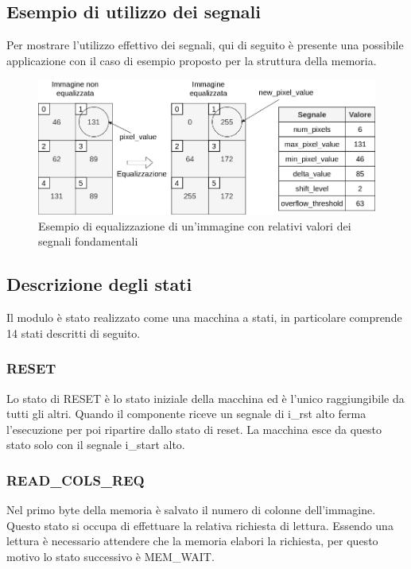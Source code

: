 \documentclass{article}
\begin{document}
\subsection{Esempio di utilizzo dei segnali}
Per mostrare l'utilizzo effettivo dei segnali, qui di seguito è presente una possibile applicazione con il caso di esempio proposto per la struttura della memoria.

\begin{figure}[h]
    \vspace{1cm}
    \includegraphics[width=\textwidth]{example.png}
    \centering
    \caption{Esempio di equalizzazione di un'immagine con relativi valori dei segnali fondamentali}
\end{figure}

\pagebreak

\subsection{Descrizione degli stati}
Il modulo è stato realizzato come una macchina a stati, in particolare comprende 14 stati descritti di seguito.

\subsubsection{RESET}
Lo stato di RESET è lo stato iniziale della macchina ed è l'unico raggiungibile da tutti gli altri. Quando il componente riceve un segnale di i\_rst alto ferma l'esecuzione per poi ripartire dallo stato di reset. La macchina esce da questo stato solo con il segnale i\_start alto.

\subsubsection{READ\_COLS\_REQ}
Nel primo byte della memoria è salvato il numero di colonne dell'immagine. Questo stato si occupa di effettuare la relativa richiesta di lettura. Essendo una lettura è necessario attendere che la memoria elabori la richiesta, per questo motivo lo stato successivo è MEM\_WAIT.
\end{document}
